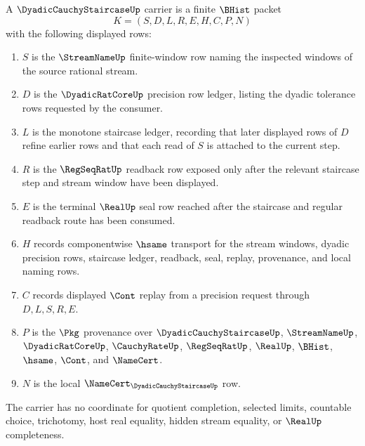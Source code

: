 \begin{definition}
\label{def:dyadic-cauchy-staircase-carrier}
A $\DyadicCauchyStaircaseUp$ carrier is a finite $\BHist$ packet
$$
K=(S,D,L,R,E,H,C,P,N)
$$
with the following displayed rows:
\begin{enumerate}
\item $S$ is the $\StreamNameUp$ finite-window row naming the inspected windows of the source rational stream.
\item $D$ is the $\DyadicRatCoreUp$ precision row ledger, listing the dyadic tolerance rows requested by the consumer.
\item $L$ is the monotone staircase ledger, recording that later displayed rows of $D$ refine earlier rows and that each read of $S$ is attached to the current step.
\item $R$ is the $\RegSeqRatUp$ readback row exposed only after the relevant staircase step and stream window have been displayed.
\item $E$ is the terminal $\RealUp$ seal row reached after the staircase and regular readback route has been consumed.
\item $H$ records componentwise $\hsame$ transport for the stream windows, dyadic precision rows, staircase ledger, readback, seal, replay, provenance, and local naming rows.
\item $C$ records displayed $\Cont$ replay from a precision request through $D,L,S,R,E$.
\item $P$ is the $\Pkg$ provenance over $\DyadicCauchyStaircaseUp$, $\StreamNameUp$, $\DyadicRatCoreUp$, $\CauchyRateUp$, $\RegSeqRatUp$, $\RealUp$, $\BHist$, $\hsame$, $\Cont$, and $\NameCert$.
\item $N$ is the local $\NameCert_{\DyadicCauchyStaircaseUp}$ row.
\end{enumerate}
The carrier has no coordinate for quotient completion, selected limits, countable choice, trichotomy, host real equality, hidden stream equality, or $\RealUp$ completeness.
\end{definition}

